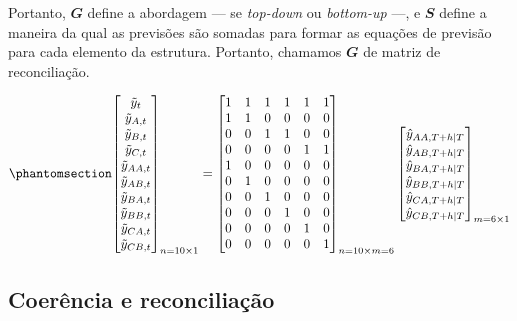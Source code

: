 \documentclass[
  12pt,
  twoside,
  openright,
  a4paper,
  chapter=TITLE,
  section=TITLE,
  brazil]{abntex2}
\begin{document}
Portanto, \(\mathbfit{G}\) define a abordagem --- se \emph{top-down} ou
\emph{bottom-up} ---, e \(\mathbfit{S}\) define a maneira da qual as
previsões são somadas para formar as equações de previsão para cada
elemento da estrutura. Portanto, chamamos \(\mathbfit{G}\) de matriz de
reconciliação.

\begin{equation}\phantomsection\label{eq-matriz_bottomup}{
\begin{bmatrix}
    \tilde{y}_{t} \\
    \tilde{y}_{A, t} \\
    \tilde{y}_{B, t} \\
    \tilde{y}_{C, t} \\
    \tilde{y}_{AA, t} \\
    \tilde{y}_{AB, t} \\
    \tilde{y}_{BA, t} \\
    \tilde{y}_{BB, t} \\
    \tilde{y}_{CA, t} \\
    \tilde{y}_{CB, t}
\end{bmatrix}_{n=10 \times 1}
=
\begin{bmatrix}
    1 & 1 & 1 & 1 & 1 & 1 \\
    1 & 1 & 0 & 0 & 0 & 0 \\
    0 & 0 & 1 & 1 & 0 & 0 \\
    0 & 0 & 0 & 0 & 1 & 1 \\
    1 & 0 & 0 & 0 & 0 & 0 \\
    0 & 1 & 0 & 0 & 0 & 0 \\
    0 & 0 & 1 & 0 & 0 & 0 \\
    0 & 0 & 0 & 1 & 0 & 0 \\
    0 & 0 & 0 & 0 & 1 & 0 \\
    0 & 0 & 0 & 0 & 0 & 1
\end{bmatrix}_{n=10 \times m=6}
\begin{bmatrix}
    \hat{y}_{AA, T+h|T} \\
    \hat{y}_{AB, T+h|T} \\
    \hat{y}_{BA, T+h|T} \\
    \hat{y}_{BB, T+h|T} \\
    \hat{y}_{CA, T+h|T} \\
    \hat{y}_{CB, T+h|T}
\end{bmatrix}_{m=6 \times 1}
}\end{equation}

\subsection{Coerência e
reconciliação}\label{coeruxeancia-e-reconciliauxe7uxe3o}
\end{document}

